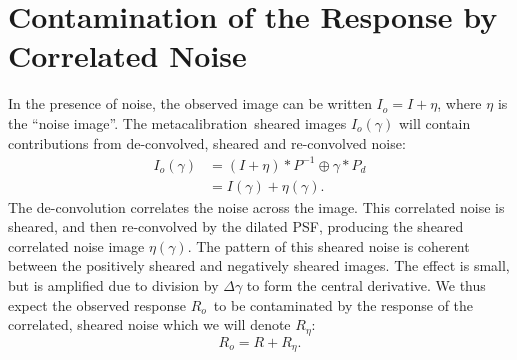 \documentclass[a4paper,fleqn,usenatbib]{mnras}
\newcommand{\mcal}{metacalibration}
\newcommand{\mcalRo}{$R_o$}
\newcommand{\mcalRnoise}{$R_\eta$}
\newcommand{\SSs}{$\left<R_{S}R_{S}\right>$}
\begin{document}

\section{Contamination of the Response by Correlated Noise} \label{sec:contam}

In the presence of noise, the observed image can be written $I_o=I+\eta$, where $\eta$
is the ``noise image''.  The \mcal\ sheared images $I_o(\gamma)$ will contain
contributions from de-convolved, sheared and re-convolved noise:
\begin{align}
    I_{o}(\gamma) &= (I + \eta) \ast P^{-1} \oplus \gamma \ast P_{d} \nonumber \\
    &= I(\gamma) + \eta(\gamma).
\end{align}
The de-convolution correlates the noise across the image.  This correlated
noise is sheared, and then re-convolved by the dilated PSF, producing the
sheared correlated noise image $\eta(\gamma)$.  The pattern of this sheared
noise is coherent between the positively sheared and negatively sheared images.
The effect is small, but is amplified due to division by $\Delta \gamma$ to
form the central derivative.  We thus expect the observed response \mcalRo\ to
be contaminated by the response of the correlated, sheared noise which
we will denote \mcalRnoise:
\begin{equation}
    \mbox{\mcalRo}  =  R + \mbox{\mcalRnoise}.
\end{equation}
\end{document}
